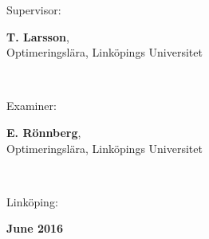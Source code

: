 \documentclass[a4paper, 10pt, twoside, openright]{book}
\newcommand{\putthemonth}[0]{June }%
\newcommand{\putshortdate}[0]{2016}
\newcommand{\putmydate}[0]{\putthemonth \putshortdate}
\newcommand{\putexaminer}[0]{E. Rönnberg}
\newcommand{\putsupervisor}[0]{T. Larsson}
\newcommand{\putdepartment}[0]{Optimeringslära}
\newcommand{\putliu}[0]{Linköpings Universitet}
\begin{document}
{\begin{minipage}{150mm}
                Supervisor:\hspace*{3pt}
                \begin{minipage}[t]{120mm}
                  \textbf{\putsupervisor}, \\\putdepartment, \putliu
                \end{minipage} \\ \vspace*{4mm}
                
                Examiner:\hspace*{3pt}
                \begin{minipage}[t]{120mm}
                  \textbf{\putexaminer}, \\\putdepartment, \putliu
                \end{minipage} \\ \vspace*{4mm}
                
                Linköping:
                \begin{minipage}[t]{70mm}
                  \textbf{\putmydate}
                \end{minipage} \\ \vspace*{4mm}
              \end{minipage} \\ \hfill
}

\maketitle

\phantom{crap}
\thispagestyle{empty}
\pagestyle{empty}

\setlength{\unitlength}{1mm}



\setlength{\unitlength}{1pt}
\end{document}
